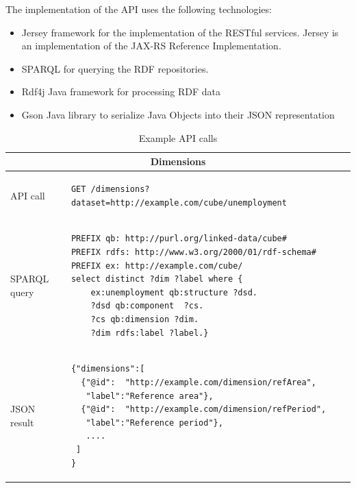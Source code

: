 \documentclass{llncs}
\begin{document}
The implementation of the API uses the following technologies:
\begin{itemize}
\item Jersey  framework for the implementation of the RESTful services. Jersey is an implementation of the JAX-RS  Reference Implementation. 
\item SPARQL  for querying the RDF repositories. 
\item Rdf4j  Java framework for processing RDF data 
\item Gson  Java library to serialize Java Objects into their JSON representation  
\end{itemize}



\begin{table}
\caption{Example API calls}
\begin{tabular}{|l|l|}
\hline
\multicolumn{2}{|c|}{\textbf{Dimensions}}\\

\hline
API call &
\begin{minipage}[t]{4.5in}
 \begin{verbatim} 
GET /dimensions?dataset=http://example.com/cube/unemployment         
\end{verbatim}
\end{minipage}\\\hline

SPARQL query  &
\begin{minipage}[t]{4.5in}
 \begin{verbatim} 
PREFIX qb: http://purl.org/linked-data/cube#
PREFIX rdfs: http://www.w3.org/2000/01/rdf-schema#
PREFIX ex: http://example.com/cube/
select distinct ?dim ?label where {
    ex:unemployment qb:structure ?dsd.
    ?dsd qb:component  ?cs.
    ?cs qb:dimension ?dim.
    ?dim rdfs:label ?label.} 
\end{verbatim}
\end{minipage}\\ \hline

JSON result &
\begin{minipage}[t]{4.5in}
 \begin{verbatim} 
{"dimensions":[
  {"@id":  "http://example.com/dimension/refArea",
   "label":"Reference area"},
  {"@id":  "http://example.com/dimension/refPeriod",
   "label":"Reference period"},
   ....
 ]
}  
\end{verbatim}
\end{minipage}\\\hline




\end{tabular}
\end{table}
\end{document}
